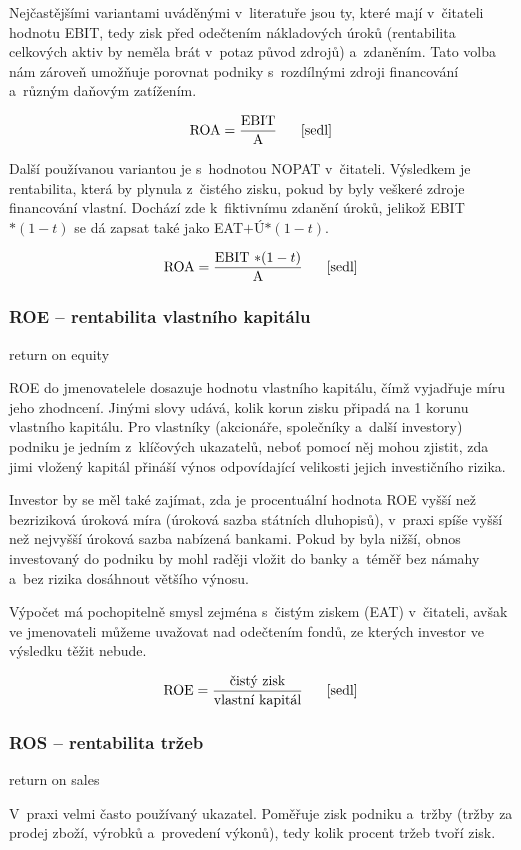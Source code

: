 Nejčastějšími variantami uváděnými v~literatuře jsou ty, které mají v~čitateli hodnotu EBIT, tedy zisk před odečtením nákladových úroků (rentabilita celkových aktiv by neměla brát v~potaz původ zdrojů) a~zdaněním. Tato volba nám zároveň umožňuje porovnat podniky s~rozdílnými zdroji financování a~různým daňovým zatížením.

$$\vz{ROA}{EBIT}{A} \scite{sedl}$$

Další používanou variantou je s~hodnotou NOPAT v~čitateli. Výsledkem je rentabilita, která by plynula z~čistého zisku, pokud by byly veškeré zdroje financování vlastní. Dochází zde k~fiktivnímu zdanění úroků, jelikož EBIT$*(1-t)$ se dá zapsat také jako EAT$+$Ú$*(1-t)$.

$$\vz{ROA}{EBIT $*(1-t)$}{A} \scite{sedl}$$ 


\subsubsection{ROE -- rentabilita vlastního kapitálu}
return on equity

ROE do jmenovatelele dosazuje hodnotu vlastního kapitálu, čímž vyjadřuje míru jeho zhodncení. Jinými slovy udává, kolik korun zisku připadá na 1 korunu vlastního kapitálu. Pro vlastníky (akcionáře, společníky a~další investory) podniku je jedním z~klíčových ukazatelů, neboť pomocí něj mohou zjistit, zda jimi vložený kapitál přináší výnos odpovídající velikosti jejich investičního rizika\cite{sedl}.

Investor by se měl také zajímat, zda je procentuální hodnota ROE vyšší než bezriziková úroková míra (úroková sazba státních dluhopisů), v~praxi spíše vyšší než nejvyšší úroková sazba nabízená bankami. Pokud by byla nižší, obnos investovaný do podniku by mohl raději vložit do banky a~téměř bez námahy a~bez rizika dosáhnout většího výnosu.

Výpočet má pochopitelně smysl zejména s~čistým ziskem (EAT) v~čitateli, avšak ve jmenovateli můžeme uvažovat nad odečtením fondů, ze kterých investor ve výsledku těžit nebude.

$$\vz{ROE}{čistý zisk}{vlastní kapitál} \scite{sedl}$$ 


\subsubsection{ROS -- rentabilita tržeb}
return on sales

V~praxi velmi často používaný ukazatel. Poměřuje zisk podniku a~tržby (tržby za prodej zboží, výrobků a~provedení výkonů), tedy kolik procent tržeb tvoří zisk.

